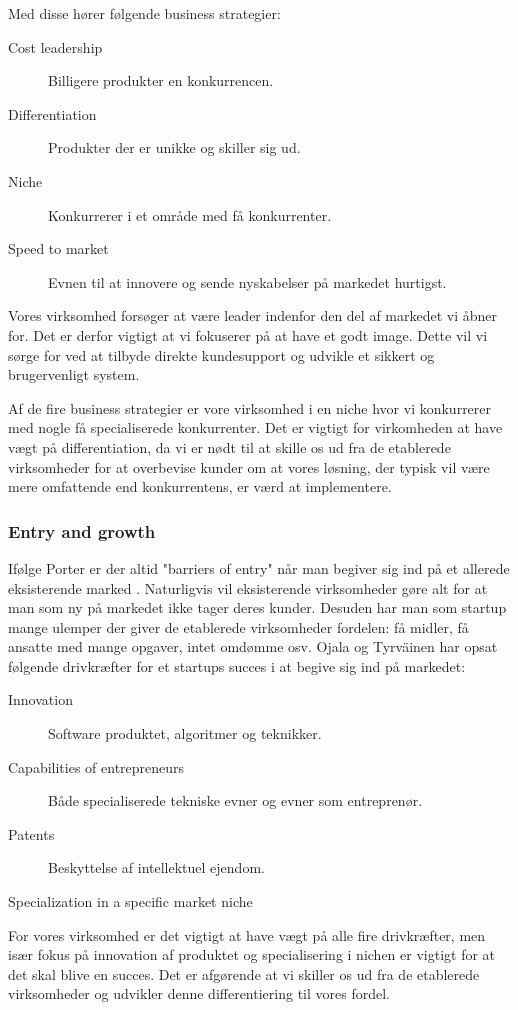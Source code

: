 Med disse hører følgende business strategier:
\begin{description}
	\item[Cost leadership] Billigere produkter en konkurrencen.
	\item [Differentiation] Produkter der er unikke og skiller sig ud.
	\item [Niche] Konkurrerer i et område med få konkurrenter.
	\item [Speed to market] Evnen til at innovere og sende nyskabelser på markedet hurtigst.
\end{description}

Vores virksomhed forsøger at være leader indenfor den del af markedet vi åbner for.
Det er derfor vigtigt at vi fokuserer på at have et godt image.
Dette vil vi sørge for ved at tilbyde direkte kundesupport og udvikle et sikkert og brugervenligt system.

Af de fire business strategier er vore virksomhed i en niche hvor vi konkurrerer med nogle få specialiserede konkurrenter.
Det er vigtigt for virkomheden at have vægt på differentiation, da vi er nødt til at skille os ud fra de etablerede virksomheder for at overbevise kunder om at vores løsning, der typisk vil være mere omfattende end konkurrentens, er værd at implementere.

\subsubsection{Entry and growth}
Ifølge Porter er der altid "barriers of entry" når man begiver sig ind på et allerede eksisterende marked \citep[p.~50]{rose2012software}.
Naturligvis vil eksisterende virksomheder gøre alt for at man som ny på markedet ikke tager deres kunder.
Desuden har man som startup mange ulemper der giver de etablerede virksomheder fordelen: få midler, få ansatte med mange opgaver, intet omdømme osv.
Ojala og Tyrväinen har opsat følgende drivkræfter for et startups succes i at begive sig ind på markedet: \citep[p.~50]{rose2012software}

\begin{description}
	\item[Innovation] Software produktet, algoritmer og teknikker.
	\item [Capabilities of entrepreneurs] Både specialiserede tekniske evner og evner som entreprenør.
	\item [Patents] Beskyttelse af intellektuel ejendom.
	\item [Specialization in a specific market niche]
\end{description}

For vores virksomhed er det vigtigt at have vægt på alle fire drivkræfter, men især fokus på innovation af produktet og specialisering i nichen er vigtigt for at det skal blive en succes.
Det er afgørende at vi skiller os ud fra de etablerede virksomheder og udvikler denne differentiering til vores fordel.
